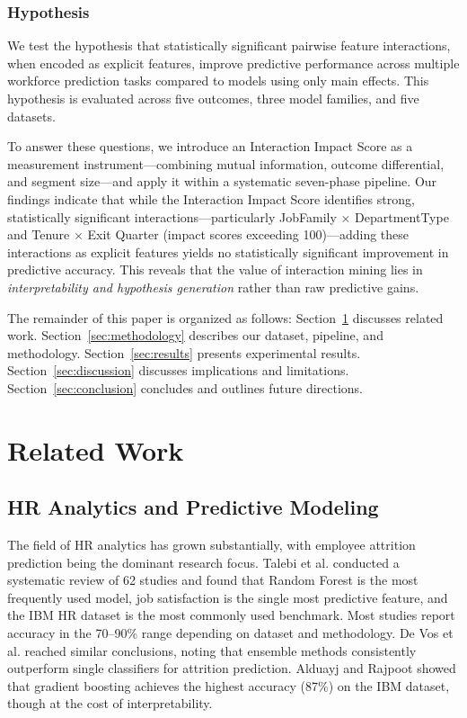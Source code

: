 \documentclass[conference]{IEEEtran}
\begin{document}
\subsubsection*{Hypothesis}
We test the hypothesis that statistically significant pairwise feature interactions, when encoded as explicit features, improve predictive performance across multiple workforce prediction tasks compared to models using only main effects. This hypothesis is evaluated across five outcomes, three model families, and five datasets.

To answer these questions, we introduce an Interaction Impact Score as a measurement instrument---combining mutual information, outcome differential, and segment size---and apply it within a systematic seven-phase pipeline. Our findings indicate that while the Interaction Impact Score identifies strong, statistically significant interactions---particularly JobFamily $\times$ DepartmentType and Tenure $\times$ Exit Quarter (impact scores exceeding 100)---adding these interactions as explicit features yields no statistically significant improvement in predictive accuracy. This reveals that the value of interaction mining lies in \textit{interpretability and hypothesis generation} rather than raw predictive gains.

The remainder of this paper is organized as follows: Section~\ref{sec:related} discusses related work. Section~\ref{sec:methodology} describes our dataset, pipeline, and methodology. Section~\ref{sec:results} presents experimental results. Section~\ref{sec:discussion} discusses implications and limitations. Section~\ref{sec:conclusion} concludes and outlines future directions.

\section{Related Work}
\label{sec:related}

\subsection{HR Analytics and Predictive Modeling}

The field of HR analytics has grown substantially, with employee attrition prediction being the dominant research focus. Talebi et al. \cite{talebi2025systematic} conducted a systematic review of 62 studies and found that Random Forest is the most frequently used model, job satisfaction is the single most predictive feature, and the IBM HR dataset \cite{ibmhr} is the most commonly used benchmark. Most studies report accuracy in the 70--90\% range depending on dataset and methodology. De Vos et al. \cite{devos2024predicting} reached similar conclusions, noting that ensemble methods consistently outperform single classifiers for attrition prediction. Alduayj and Rajpoot \cite{alduayj2020predicting} showed that gradient boosting achieves the highest accuracy (87\%) on the IBM dataset, though at the cost of interpretability.
\end{document}
